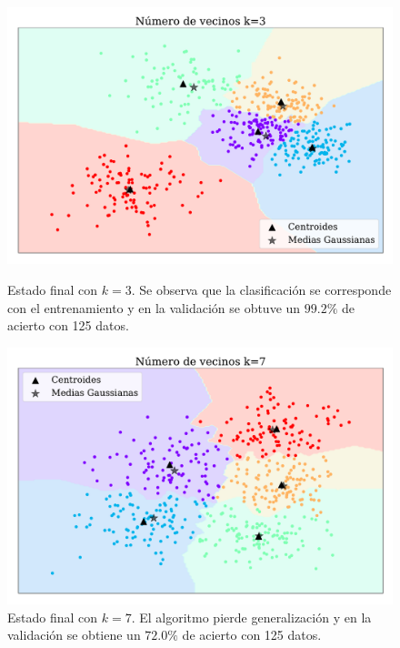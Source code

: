     
\begin{figure}[H]
    \centering
    \begin{minipage}{.485\textwidth}
    \centering
    \includegraphics[width=\linewidth]{plots/ejer_4_K-3_si_converge.pdf}
    \caption{Estado final con $k=3$. Se observa que la clasificación se corresponde con el entrenamiento y en la validación se obtuve un $99.2\%$ de acierto con 125 datos.}
    \label{fig:ejer4_k_3}
    \end{minipage}%
    \hfill
    \begin{minipage}{.485\textwidth}
        \centering
        \includegraphics[width=\linewidth]{plots/ejer_4_K-7_si_converge.pdf}
        \caption{Estado final con $k=7$. El algoritmo pierde generalización y en la validación se obtiene un $72.0\%$ de acierto con 125 datos. }
        \label{fig:ejer4_k_7}
    \end{minipage}
\end{figure}
    

